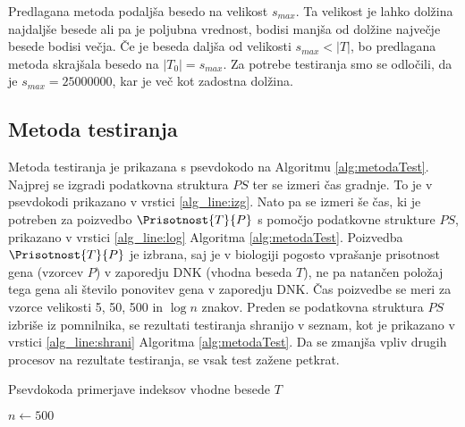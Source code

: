 Predlagana metoda podaljša besedo na velikost $s_{max}$. Ta velikost je lahko dolžina najdaljše besede ali pa je poljubna vrednost, bodisi manjša od dolžine največje besede bodisi večja. Če je beseda daljša od velikosti $s_{max}<|T|$, bo predlagana metoda skrajšala besedo na $|T_0|=s_{max}$. Za potrebe testiranja smo se odločili, da je $s_{max}=25000000$, kar je več kot zadostna dolžina.

\subsection{Metoda testiranja}
Metoda testiranja je prikazana s psevdokodo na Algoritmu \ref{alg:metodaTest}. Najprej se izgradi podatkovna struktura $PS$ ter se izmeri čas gradnje. To je v psevdokodi prikazano v vrstici \ref{alg_line:izg}. Nato pa se izmeri še čas, ki je potreben za poizvedbo $\Prisotnost{T}{P}$ s pomočjo podatkovne strukture $PS$, prikazano v vrstici \ref{alg_line:log} Algoritma \ref{alg:metodaTest}. Poizvedba $\Prisotnost{T}{P}$ je izbrana, saj je v biologiji pogosto vprašanje prisotnost gena (vzorcev $P$) v zaporedju DNK (vhodna beseda $T$), ne pa natančen položaj tega gena ali število ponovitev gena v zaporedju DNK. Čas poizvedbe se meri za vzorce velikosti 5, 50, 500 in $\log{n}$ znakov. Preden se podatkovna struktura $PS$ izbriše iz pomnilnika, se rezultati testiranja shranijo v seznam, kot je prikazano v vrstici \ref{alg_line:shrani} Algoritma \ref{alg:metodaTest}. Da se zmanjša vpliv drugih procesov na rezultate testiranja, se vsak test zažene petkrat.


\begin{algorithm}[htb]

\caption{Psevdokoda primerjave indeksov vhodne besede $T$}\label{alg:metodaTest}
{
    {$n \leftarrow 500$}
    
    
}
\end{algorithm}

